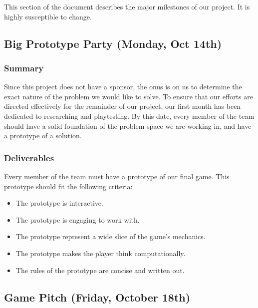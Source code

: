 This section of the document describes the major milestones of our project. It
is highly susceptible to change.

\subsection{Big Prototype Party (Monday, Oct 14th)}

\subsubsection*{Summary}
Since this project does not have a sponsor, the onus is on us to determine the
exact nature of the problem we would like to solve. To ensure that our efforts
are directed effectively for the remainder of our project, our first month has
been dedicated to researching and playtesting. By this date, every member of the
team should have a solid foundation of the problem space we are working in, and
have a prototype of a solution.

\subsubsection*{Deliverables}
Every member of the team must have a prototype of our final game. This prototype
should fit the following criteria:
\begin{itemize}
  \item The prototype is interactive.
  \item The prototype is engaging to work with.
  \item The prototype represent a wide slice of the game’s mechanics.
  \item The prototype makes the player think computationally.
  \item The rules of the prototype are concise and written out.
\end{itemize}

\subsection{Game Pitch (Friday, October 18th)}

